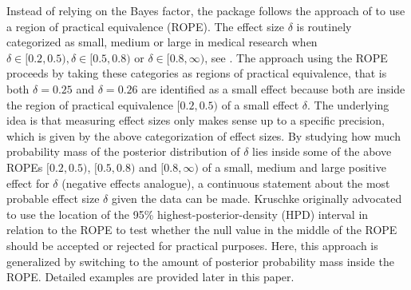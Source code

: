 Instead of relying on the Bayes factor, the  package follows the approach of \cite{Kruschke2018a} to use a region of practical equivalence (ROPE). The effect size $\delta$ is routinely categorized as small, medium or large in medical research when $\delta \in [0.2,0.5),\delta \in [0.5,0.8)$ or $\delta \in [0.8,\infty)$, see \cite{cohen_statistical_1988}. The approach using the ROPE proceeds by taking these categories as regions of practical equivalence, that is both $\delta=0.25$ and $\delta=0.26$ are identified as a small effect because both are inside the region of practical equivalence $[0.2,0.5)$ of a small effect $\delta$. The underlying idea is that measuring effect sizes only makes sense up to a specific precision, which is given by the above categorization of effect sizes. By studying how much probability mass of the posterior distribution of $\delta$ lies inside some of the above ROPEs $[0.2,0.5)$, $[0.5,0.8)$ and $[0.8,\infty)$ of a small, medium and large positive effect for $\delta$ (negative effects analogue), a continuous statement about the most probable effect size $\delta$ given the data can be made. Kruschke originally advocated to use the location of the 95\% highest-posterior-density (HPD) interval in relation to the ROPE to test whether the null value in the middle of the ROPE should be accepted or rejected for practical purposes. Here, this approach is generalized by switching to the amount of posterior probability mass inside the ROPE. Detailed examples are provided later in this paper.

